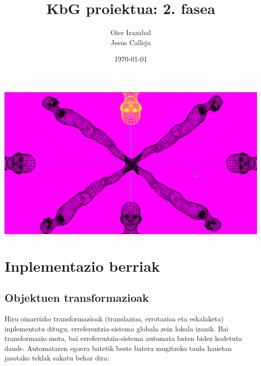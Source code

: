 \documentclass[12pt]{article}
\title{KbG proiektua: 2. fasea}
\author{
        Oier Irazabal\\
        Jesus Calleja
}
\date{\today}
\begin{document}
\maketitle


\tableofcontents

\vspace{2cm}
\begin{center}
\includegraphics[scale=0.35]{kaizo.png}\\
\end{center}

\pagebreak



\section{Inplementazio berriak}

\subsection{Objektuen transformazioak}\label{transformazioak}

Hiru oinarrizko transformazioak (translazioa, errotazioa eta eskalaketa) inplementatu ditugu, erreferentzia-sistema globala zein lokala izanik.
Bai transformazio mota, bai erreferentzia-sistema automata baten bidez kodetuta daude. Automataren egoera batetik beste batera mugitzeko taula hauetan jasotako teklak sakatu behar dira:\\
\end{document}
